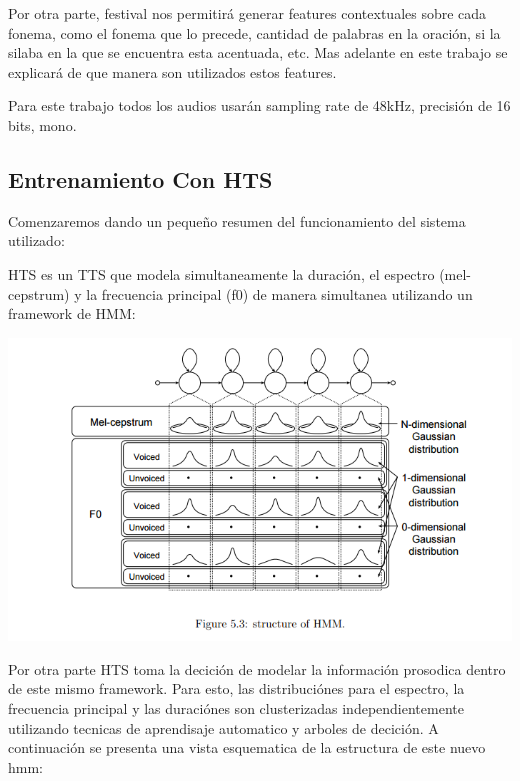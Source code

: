 Por otra parte, festival nos permitirá generar features contextuales sobre cada fonema, como el fonema que lo precede, cantidad de palabras en la oración, si la silaba en la que se encuentra esta acentuada, etc. Mas adelante en este trabajo se explicará de que manera son utilizados estos features.


Para este trabajo todos los audios usarán sampling rate de 48kHz, precisión de 16 bits, mono.



\subsection{Entrenamiento Con HTS}


Comenzaremos dando un pequeño resumen del funcionamiento del sistema utilizado:


HTS es un TTS que modela simultaneamente la duración, el espectro (mel-cepstrum) y la frecuencia principal (f0) de manera simultanea utilizando un framework de HMM:

\includegraphics[scale=0.5]{imagenes/hmm.png}


Por otra parte HTS toma la decición de modelar la información prosodica dentro de este mismo framework. Para esto, las distribuciónes para el espectro, la frecuencia principal y las duraciónes son clusterizadas independientemente utilizando tecnicas de aprendisaje automatico y arboles de decición. A continuación se presenta una vista esquematica de la estructura de este nuevo hmm:

